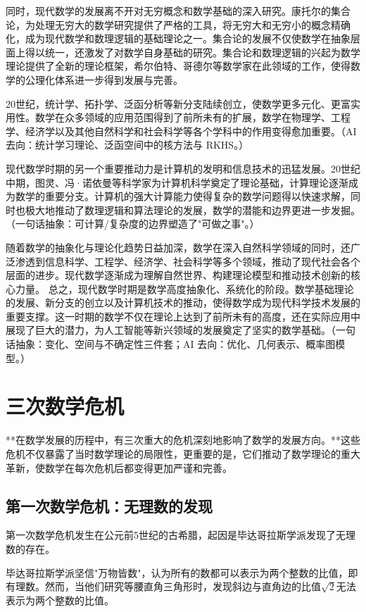 同时，现代数学的发展离不开对无穷概念和数学基础的深入研究。康托尔的集合论，为处理无穷大的数学研究提供了严格的工具，将无穷大和无穷小的概念精确化，成为现代数学和数理逻辑的基础理论之一。集合论的发展不仅使数学在抽象层面上得以统一，还激发了对数学自身基础的研究。集合论和数理逻辑的兴起为数学理论提供了全新的理论框架，希尔伯特、哥德尔等数学家在此领域的工作，使得数学的公理化体系进一步得到发展与完善。

20世纪，统计学、拓扑学、泛函分析等新分支陆续创立，使数学更多元化、更富实用性。数学在众多领域的应用范围得到了前所未有的扩展，数学在物理学、工程学、经济学以及其他自然科学和社会科学等各个学科中的作用变得愈加重要。{（AI 去向：统计学习理论、泛函空间中的核方法与 RKHS。）}

现代数学时期的另一个重要推动力是计算机的发明和信息技术的迅猛发展。20世纪中期，图灵、冯·诺依曼等科学家为计算机科学奠定了理论基础，计算理论逐渐成为数学的重要分支。计算机的强大计算能力使得复杂的数学问题得以快速求解，同时也极大地推动了数理逻辑和算法理论的发展，数学的潜能和边界更进一步发掘。{（一句话抽象：可计算/复杂度的边界塑造了"可做之事"。）}

随着数学的抽象化与理论化趋势日益加深，数学在深入自然科学领域的同时，还广泛渗透到信息科学、工程学、经济学、社会科学等多个领域，推动了现代社会各个层面的进步。现代数学逐渐成为理解自然世界、构建理论模型和推动技术创新的核心力量。
总之，现代数学时期是数学高度抽象化、系统化的阶段。数学基础理论的发展、新分支的创立以及计算机技术的推动，使得数学成为现代科学技术发展的重要支撑。这一时期的数学不仅在理论上达到了前所未有的高度，还在实际应用中展现了巨大的潜力，为人工智能等新兴领域的发展奠定了坚实的数学基础。{（一句话抽象：变化、空间与不确定性三件套；AI 去向：优化、几何表示、概率图模型。）}

\section{三次数学危机}
**在数学发展的历程中，有三次重大的危机深刻地影响了数学的发展方向。**这些危机不仅暴露了当时数学理论的局限性，更重要的是，它们推动了数学理论的重大革新，使数学在每次危机后都变得更加严谨和完善。

\subsection{第一次数学危机：无理数的发现}
第一次数学危机发生在公元前5世纪的古希腊，起因是毕达哥拉斯学派发现了无理数的存在。

毕达哥拉斯学派坚信"万物皆数"，认为所有的数都可以表示为两个整数的比值，即有理数。然而，当他们研究等腰直角三角形时，发现斜边与直角边的比值$\sqrt{2}$无法表示为两个整数的比值。

